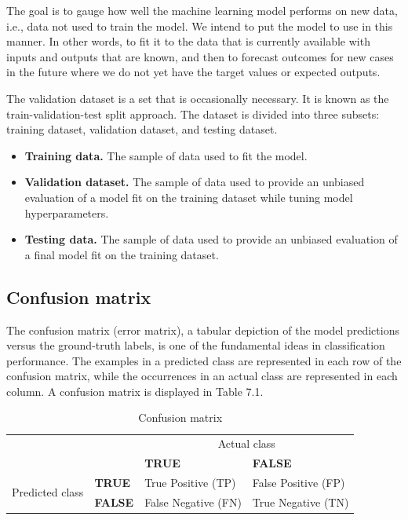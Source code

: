 The goal is to gauge how well the machine learning model performs on new data, i.e., data not used to train the model. We intend to put the model to use in this manner. In other words, to fit it to the data that is currently available with inputs and outputs that are known, and then to forecast outcomes for new cases in the future where we do not yet have the target values or expected outputs.

The validation dataset is a set that is occasionally necessary. It is known as the train-validation-test split approach. The dataset is divided into three subsets: training dataset, validation dataset, and testing dataset.

\begin{itemize}
	\item \textbf{Training data.} The sample of data used to fit the model.
	\item \textbf{Validation dataset.} The sample of data used to provide an unbiased evaluation of a model fit on the training dataset while tuning model hyperparameters.
	\item \textbf{Testing data.} The sample of data used to provide an unbiased evaluation of a final model fit on the training dataset.
\end{itemize}

\subsection{Confusion matrix}
\hspace{0.5cm}The confusion matrix (error matrix), a tabular depiction of the model predictions versus the ground-truth labels, is one of the fundamental ideas in classification performance. The examples in a predicted class are represented in each row of the confusion matrix, while the occurrences in an actual class are represented in each column.  A confusion matrix is
displayed in Table 7.1.

\begin{table}[h!]
	\begin{tabular}{llll}
													   &                            & \multicolumn{2}{c}{Actual class}                                                 \\ \cline{3-4} 
													   & \multicolumn{1}{l|}{}      & \multicolumn{1}{l|}{\textbf{TRUE}}                & \multicolumn{1}{l|}{\textbf{FALSE}}               \\ \cline{2-4} 
	\multicolumn{1}{c|}{\multirow{2}{*}{Predicted class}} & \multicolumn{1}{l|}{\textbf{TRUE}}  & \multicolumn{1}{l|}{True Positive (TP)}  & \multicolumn{1}{l|}{False Positive (FP)} \\ \cline{2-4} 
	\multicolumn{1}{c|}{}                              & \multicolumn{1}{l|}{\textbf{FALSE}} & \multicolumn{1}{l|}{False Negative (FN)} & \multicolumn{1}{l|}{True Negative (TN)}  \\ \cline{2-4} 
	\end{tabular}
	\caption{\label{demo-table-3} Confusion matrix}
\end{table} 

